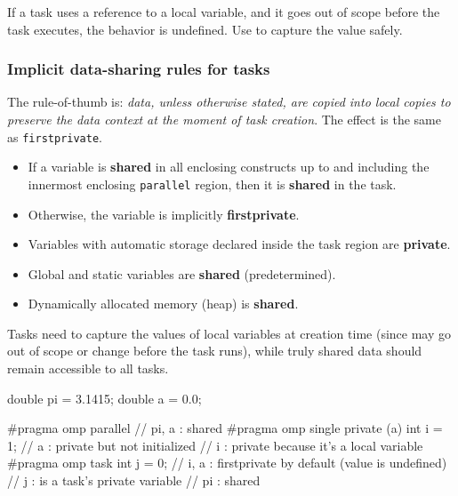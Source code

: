 \begin{warningblock}
If a task uses a  reference to a local variable, and it goes out of scope before the task executes, the behavior is undefined. Use  to capture the value safely.
\end{warningblock}

\subsubsection{Implicit data-sharing rules for tasks}

The rule-of-thumb is: \textit{data, unless otherwise stated, are copied into local copies to preserve the data context at the moment of task creation}. The effect is the same as \texttt{firstprivate}.

\begin{itemize}[noitemsep]
    \item If a variable is \textbf{shared} in all enclosing constructs up to and including the innermost enclosing \texttt{parallel} region, then it is \textbf{shared} in the task.
    \item Otherwise, the variable is implicitly \textbf{firstprivate}.
    \item Variables with automatic storage declared inside the task region are \textbf{private}.
    \item Global and static variables are \textbf{shared} (predetermined).
    \item Dynamically allocated memory (heap) is \textbf{shared}.
\end{itemize}

Tasks need to capture the values of local variables at creation time (since may go out of scope or change before the task runs), while truly shared data should remain accessible to all tasks.

\begin{codeblock}[language=C]
double pi = 3.1415;
double a = 0.0;

#pragma omp parallel
{
    // pi, a : shared
    #pragma omp single private (a)
    {
        int i = 1;
        // a : private but not initialized
        // i : private because it's a local variable
        #pragma omp task
        {
            int j = 0;
            // i, a : firstprivate by default (value is undefined)
            // j : is a task's private variable
            // pi : shared
        }
    }
}
    
\end{codeblock}

